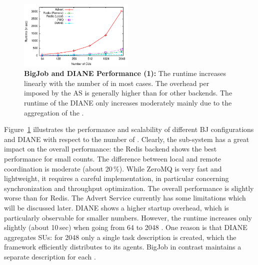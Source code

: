 \documentclass{sig-alternate}
\begin{document}





\begin{figure}[htbp] 
 \centering
 \includegraphics[width=0.49\textwidth]{perf/bigjob-varying-wus-alamo.pdf}
 \up\up
 \caption{\textbf{BigJob and DIANE Performance (1):} The 
  runtime increases linearly with the number of \cus in most cases. 
  The overhead per \cu imposed by the AS is generally 
  higher than for other backends. The runtime of the DIANE \cus only increases 
  moderately mainly due to the aggregation of the \cus.
}
 \label{fig:perf_bigjob-varying-wus} 
\end{figure}

Figure~\ref{fig:perf_bigjob-varying-wus} illustrates the performance
and scalability of different BJ configurations and DIANE with
respect to the number of \cus. Clearly, the \cc sub-system has a great
impact on the overall performance: the Redis backend shows the best
performance for small \cu counts. The difference between local and
remote coordination is moderate (about 20\,\%). While ZeroMQ is very
fast and lightweight, it requires a careful implementation, in
particular concerning synchronization and throughput optimization. The
overall performance is slightly worse than for Redis. The Advert
Service currently has some limitations which will be discussed later.
DIANE shows a higher startup overhead, which is particularly
observable for smaller \cu  numbers. However, the runtime increases only 
slightly (about 10\,sec) when going from 64 to 2048 \cus. One reason is that 
DIANE aggregates SUs: for 2048 \cus only a single task description is created, 
which the framework efficiently distributes to its agents. BigJob in contrast 
maintains a separate description for each \cu.
\end{document}
